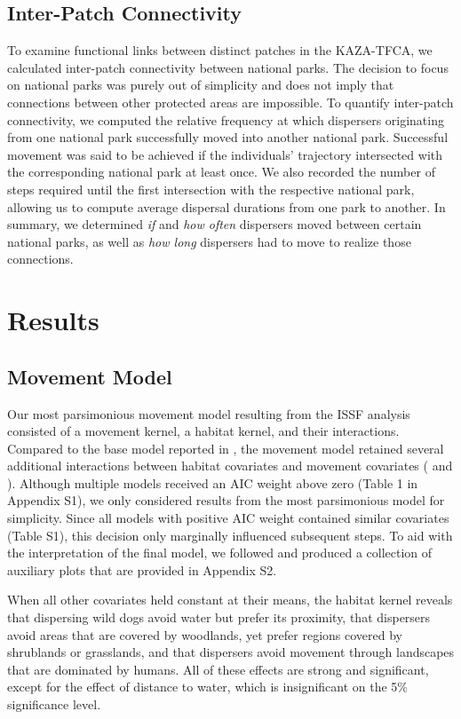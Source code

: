 \documentclass[abstract=on,10pt,a4paper,bibliography=totocnumbered]{article}
\begin{document}
\subsection{Inter-Patch Connectivity}
To examine functional links between distinct patches in the KAZA-TFCA, we
calculated inter-patch connectivity between national parks. The decision to
focus on national parks was purely out of simplicity and does not imply that
connections between other protected areas are impossible. To quantify
inter-patch connectivity, we computed the relative frequency at which dispersers
originating from one national park successfully moved into another national
park. Successful movement was said to be achieved if the individuals' trajectory
intersected with the corresponding national park at least once. We also recorded
the number of steps required until the first intersection with the respective
national park, allowing us to compute average dispersal durations from one park
to another. In summary, we determined \textit{if} and \textit{how often}
dispersers moved between certain national parks, as well as \textit{how long}
dispersers had to move to realize those connections.

\section{Results}
\subsection{Movement Model}
Our most parsimonious movement model resulting from the ISSF analysis consisted
of a movement kernel, a habitat kernel, and their interactions. Compared to the
base model reported in \citep{Hofmann.2021}, the movement model retained several
additional interactions between habitat covariates and movement covariates
( and ). Although multiple models
received an AIC weight above zero (Table 1 in Appendix S1), we only considered
results from the most parsimonious model for simplicity. Since all models with
positive AIC weight contained similar covariates (Table S1), this decision only
marginally influenced subsequent steps. To aid with the interpretation of the
final model, we followed \cite{Fieberg.2020} and produced a collection of
auxiliary plots that are provided in Appendix S2.

When all other covariates held constant at their means, the habitat kernel
reveals that dispersing wild dogs avoid water but prefer its proximity, that
dispersers avoid areas that are covered by woodlands, yet prefer regions covered
by shrublands or grasslands, and that dispersers avoid movement through
landscapes that are dominated by humans. All of these effects are strong and
significant, except for the effect of \textsf{distance to water}, which is
insignificant on the 5\% significance level.
\end{document}
